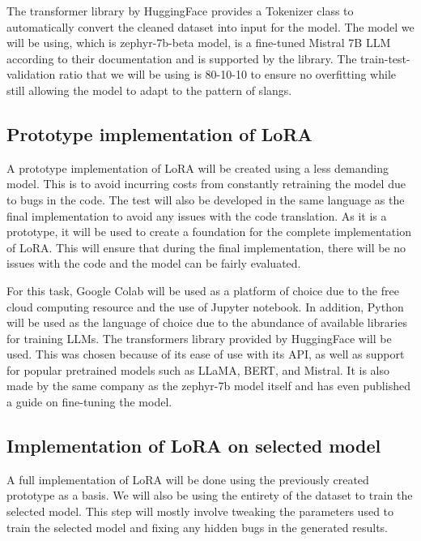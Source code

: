 The transformer library by HuggingFace provides a Tokenizer class to automatically convert the cleaned dataset into input for the model.
The model we will be using, which is zephyr-7b-beta model, is a fine-tuned Mistral 7B LLM according to their documentation and is supported by the library.
The train-test-validation ratio that we will be using is 80-10-10 to ensure no overfitting while still allowing the model to adapt to the pattern of slangs.  

\subsection{Prototype implementation of LoRA}
A prototype implementation of LoRA will be created using a less demanding model.
This is to avoid incurring costs from constantly retraining the model due to bugs in the code.
The test will also be developed in the same language as the final implementation to avoid any issues with the code translation.
As it is a prototype, it will be used to create a foundation for the complete implementation of LoRA.
This will ensure that during the final implementation, there will be no issues with the code and the model can be fairly evaluated.

For this task, Google Colab will be used as a platform of choice due to the free cloud computing resource and the use of Jupyter notebook.
In addition, Python will be used as the language of choice due to the abundance of available libraries for training LLMs. The transformers library provided by HuggingFace will be used.
This was chosen because of its ease of use with its API, as well as support for popular pretrained models such as LLaMA, BERT, and Mistral.
It is also made by the same company as the zephyr-7b model itself and has even published a guide on fine-tuning the model.

\subsection{Implementation of LoRA on selected model}
A full implementation of LoRA will be done using the previously created prototype as a basis.
We will also be using the entirety of the dataset to train the selected model.
This step will mostly involve tweaking the parameters used to train the selected model and fixing any hidden bugs in the generated results.

